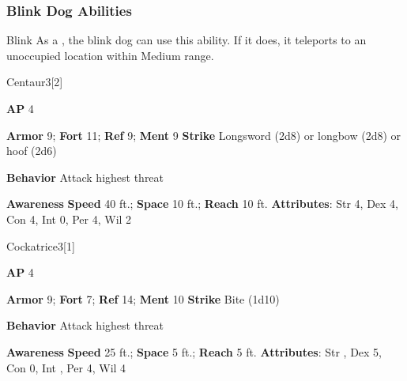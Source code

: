 \subsubsection{Blink Dog Abilities}

\begin{freeability}{Blink}
As a , the blink dog can use this ability.
If it does, it teleports to an unoccupied location within Medium range.
\end{freeability}

\begin{monsection}{Centaur}{3}[2]
\vspace{-1em}\vspace{-1em}
\begin{spellcontent}
\begin{spelltargetinginfo}
{\textbf{AP} 4}

\pari \textbf{Armor} 9;
\textbf{Fort} 11;
\textbf{Ref} 9;
\textbf{Ment} 9
\pari \textbf{Strike} Longsword  (2d8) or longbow  (2d8) or hoof  (2d6)



\pari \textbf{Behavior} Attack highest threat
\end{spelltargetinginfo}
\end{spellcontent}

\begin{monsterfooter}
\pari \textbf{Awareness} 
\pari \textbf{Speed} 40 ft.;
\textbf{Space} 10 ft.;
\textbf{Reach} 10 ft.
\pari \textbf{Attributes}:
Str 4,
Dex 4,
Con 4,
Int 0,
Per 4,
Wil 2
\end{monsterfooter}
\end{monsection}

\begin{monsection}{Cockatrice}{3}[1]
\vspace{-1em}\vspace{-1em}
\begin{spellcontent}
\begin{spelltargetinginfo}
{\textbf{AP} 4}

\pari \textbf{Armor} 9;
\textbf{Fort} 7;
\textbf{Ref} 14;
\textbf{Ment} 10
\pari \textbf{Strike} Bite  (1d10)



\pari \textbf{Behavior} Attack highest threat
\end{spelltargetinginfo}
\end{spellcontent}

\begin{monsterfooter}
\pari \textbf{Awareness} 
\pari \textbf{Speed} 25 ft.;
\textbf{Space} 5 ft.;
\textbf{Reach} 5 ft.
\pari \textbf{Attributes}:
Str ,
Dex 5,
Con 0,
Int ,
Per 4,
Wil 4
\end{monsterfooter}
\end{monsection}



